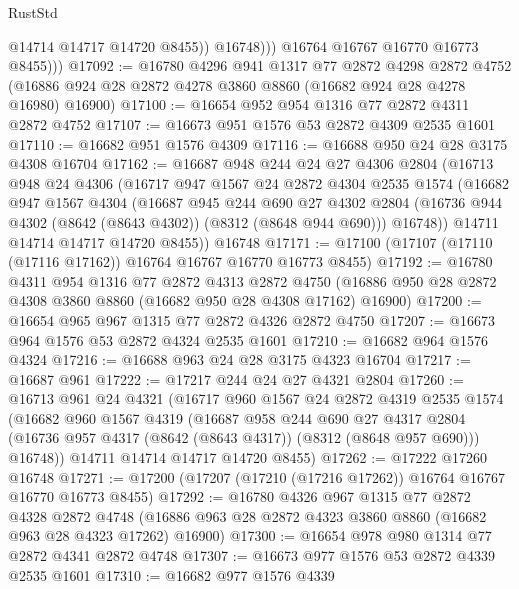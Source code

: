 \begin{lexlean}{RustStd}
\begin{coremodule}
                    @14714
                    @14717
                    @14720
                    @8455))
                @16748)))
          @16764
          @16767
          @16770
          @16773
          @8455)))
@17092 := @16780
    @4296
    @941
    @1317
    @77
    @2872
    @4298
    @2872
    @4752
    (@16886 @924 @28 @2872 @4278 @3860 @8860 (@16682 @924 @28 @4278 @16980) @16900)
@17100 := @16654 @952 @954 @1316 @77 @2872 @4311 @2872 @4752
@17107 := @16673 @951 @1576 @53 @2872 @4309 @2535 @1601
@17110 := @16682 @951 @1576 @4309
@17116 := @16688 @950 @24 @28 @3175 @4308 @16704
@17162 := @16687
    @948
    @244
    @24
    @27
    @4306
    @2804
    (@16713
      @948
      @24
      @4306
      (@16717
        @947
        @1567
        @24
        @2872
        @4304
        @2535
        @1574
        (@16682
          @947
          @1567
          @4304
          (@16687
            @945
            @244
            @690
            @27
            @4302
            @2804
            (@16736 @944 @4302 (@8642 (@8643 @4302)) (@8312 (@8648 @944 @690)))
            @16748))
        @14711
        @14714
        @14717
        @14720
        @8455))
    @16748
@17171 := @17100 (@17107 (@17110 (@17116 @17162)) @16764 @16767 @16770 @16773 @8455)
@17192 := @16780
    @4311
    @954
    @1316
    @77
    @2872
    @4313
    @2872
    @4750
    (@16886 @950 @28 @2872 @4308 @3860 @8860 (@16682 @950 @28 @4308 @17162) @16900)
@17200 := @16654 @965 @967 @1315 @77 @2872 @4326 @2872 @4750
@17207 := @16673 @964 @1576 @53 @2872 @4324 @2535 @1601
@17210 := @16682 @964 @1576 @4324
@17216 := @16688 @963 @24 @28 @3175 @4323 @16704
@17217 := @16687 @961
@17222 := @17217 @244 @24 @27 @4321 @2804
@17260 := @16713
    @961
    @24
    @4321
    (@16717
      @960
      @1567
      @24
      @2872
      @4319
      @2535
      @1574
      (@16682
        @960
        @1567
        @4319
        (@16687
          @958
          @244
          @690
          @27
          @4317
          @2804
          (@16736 @957 @4317 (@8642 (@8643 @4317)) (@8312 (@8648 @957 @690)))
          @16748))
      @14711
      @14714
      @14717
      @14720
      @8455)
@17262 := @17222 @17260 @16748
@17271 := @17200 (@17207 (@17210 (@17216 @17262)) @16764 @16767 @16770 @16773 @8455)
@17292 := @16780
    @4326
    @967
    @1315
    @77
    @2872
    @4328
    @2872
    @4748
    (@16886 @963 @28 @2872 @4323 @3860 @8860 (@16682 @963 @28 @4323 @17262) @16900)
@17300 := @16654 @978 @980 @1314 @77 @2872 @4341 @2872 @4748
@17307 := @16673 @977 @1576 @53 @2872 @4339 @2535 @1601
@17310 := @16682 @977 @1576 @4339

\end{coremodule}
\end{lexlean}
